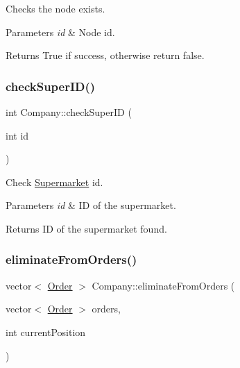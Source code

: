 Checks the node exists. 


\begin{DoxyParams}{Parameters}
{\em id} & Node id.\\
\hline
\end{DoxyParams}
\begin{DoxyReturn}{Returns}
True if success, otherwise return false. 
\end{DoxyReturn}
\mbox{\label{class_company_ac0f6d8bd213be6f0ac7fd778a1612fe9}} 
\subsubsection{\texorpdfstring{check\+Super\+I\+D()}{checkSuperID()}}
{\footnotesize\ttfamily int Company\+::check\+Super\+ID (\begin{DoxyParamCaption}\item[{int}]{id }\end{DoxyParamCaption})}



Check \hyperlink{class_supermarket}{Supermarket} id. 


\begin{DoxyParams}{Parameters}
{\em id} & ID of the supermarket.\\
\hline
\end{DoxyParams}
\begin{DoxyReturn}{Returns}
ID of the supermarket found. 
\end{DoxyReturn}
\mbox{\label{class_company_a8a7826dfc219bd2dbd470fb3c125e465}} 
\subsubsection{\texorpdfstring{eliminate\+From\+Orders()}{eliminateFromOrders()}}
{\footnotesize\ttfamily vector$<$ \hyperlink{class_order}{Order} $>$ Company\+::eliminate\+From\+Orders (\begin{DoxyParamCaption}\item[{vector$<$ \hyperlink{class_order}{Order} $>$}]{orders,  }\item[{int}]{current\+Position }\end{DoxyParamCaption})}


